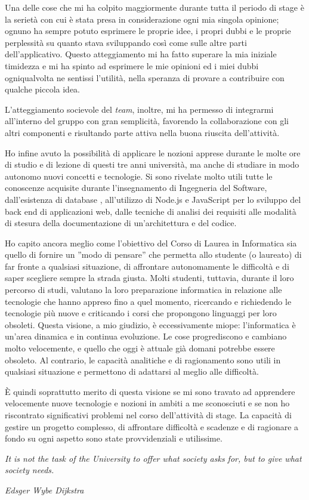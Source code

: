 Una delle cose che mi ha colpito maggiormente durante tutta il periodo di stage è la serietà con cui è stata presa in considerazione ogni mia singola opinione; ognuno ha sempre potuto esprimere le proprie idee, i propri dubbi e le proprie perplessità su quanto stava sviluppando così come sulle altre parti dell'applicativo. Questo atteggiamento mi ha fatto superare la mia iniziale timidezza e mi ha spinto ad esprimere le mie opinioni ed i miei dubbi ogniqualvolta ne sentissi l'utilità, nella speranza di provare a contribuire con qualche piccola idea. 

L'atteggiamento socievole del \textit{team}, inoltre, mi ha permesso di integrarmi all'interno del gruppo con gran semplicità, favorendo la collaborazione con gli altri componenti e risultando parte attiva nella buona riuscita dell'attività.

Ho infine avuto la possibilità di applicare le nozioni apprese durante le molte ore di studio e di lezione di questi tre anni università, ma anche di studiare in modo autonomo nuovi concetti e tecnologie. Si sono rivelate molto utili tutte le conoscenze acquisite durante l'insegnamento di Ingegneria del Software, dall'esistenza di database , all'utilizzo di Node.js e JavaScript per lo sviluppo del back end di applicazioni web, dalle tecniche di analisi dei requisiti alle modalità di stesura della documentazione di un'architettura e del codice. 

Ho capito ancora meglio come l'obiettivo del Corso di Laurea in Informatica sia quello di fornire un ''modo di pensare'' che permetta allo studente (o laureato) di far fronte a qualsiasi situazione, di affrontare autonomamente le difficoltà e di saper scegliere sempre la strada giusta. Molti studenti, tuttavia, durante il loro percorso di studi, valutano la loro preparazione informatica in relazione alle tecnologie che hanno appreso fino a quel momento, ricercando e richiedendo le tecnologie più nuove e criticando i corsi che propongono linguaggi per loro obsoleti. Questa visione, a mio giudizio, è eccessivamente miope: l'informatica è un'area dinamica e in continua evoluzione. Le cose progrediscono e cambiano molto velocemente, e quello che oggi è attuale già domani potrebbe essere obsoleto. Al contrario, le capacità analitiche e di ragionamento sono utili in qualsiasi situazione e permettono di adattarsi al meglio alle difficoltà.

È quindi soprattutto merito di questa visione se mi sono travato ad apprendere velocemente nuove tecnologie e nozioni in ambiti a me sconosciuti e se non ho riscontrato significativi problemi nel corso dell'attività di stage. La capacità di gestire un progetto complesso, di affrontare difficoltà e scadenze e di ragionare a fondo su ogni aspetto sono state provvidenziali e utilissime.

\begin{displayquote}
\centering
\textit{It is not the task of the University to offer what society asks for, but to give what society needs.}

\textit{Edsger Wybe Dijkstra}
\end{displayquote}